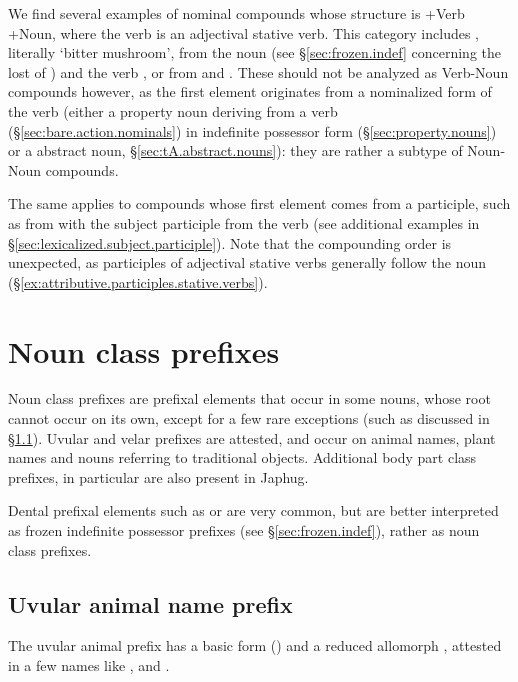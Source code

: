 We find several examples of nominal compounds whose structure is +Verb +Noun, where the verb is an adjectival stative verb. This category includes \textit{}, literally `bitter mushroom', from the noun  (see §\ref{sec:frozen.indef} concerning the lost of ) and the verb , or  from  and . These should not be analyzed as Verb-Noun compounds however, as the first element originates from a nominalized form of the verb (either a property noun deriving from a verb (§\ref{sec:bare.action.nominals}) in indefinite possessor  form (§\ref{sec:property.nouns}) or a  abstract noun, §\ref{sec:tA.abstract.nouns}): they are rather a subtype of Noun-Noun compounds.

The same applies to compounds whose first element comes from a participle, such as  from  with the subject participle   from the verb  (see additional examples in §\ref{sec:lexicalized.subject.participle}). Note that the compounding order is unexpected, as participles of adjectival stative verbs generally follow the noun (§\ref{ex:attributive.participles.stative.verbs}). 
 

\section{Noun class prefixes} \label{sec:class.prefixes}
Noun class prefixes are prefixal elements that occur in some nouns, whose root cannot occur on its own, except for a few rare exceptions (such as  discussed in §\ref{sec:uvular.animal}). Uvular  and velar  prefixes are attested, and occur on animal names, plant names and nouns referring to traditional objects. Additional body part class prefixes, in particular  are also present in Japhug. 

Dental prefixal elements such as  or  are very common, but are better interpreted as frozen indefinite possessor prefixes (see §\ref{sec:frozen.indef}), rather as noun class prefixes.

\subsection{Uvular animal name prefix} \label{sec:uvular.animal}
The uvular animal prefix has a basic form  () and a reduced allomorph , attested in a few names like ,  and .

